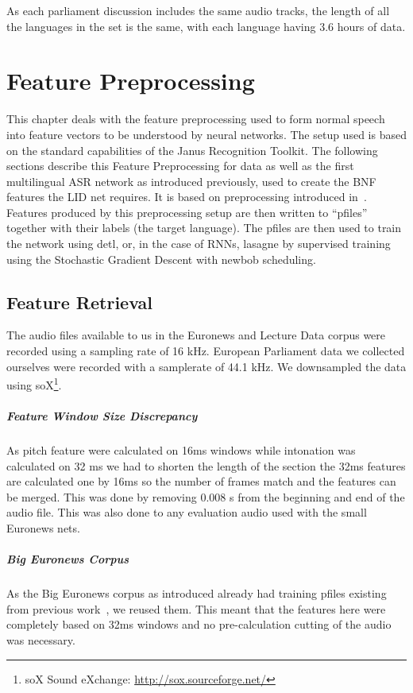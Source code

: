 As each parliament discussion includes the same audio tracks, the length of all the languages in the set is the same, with each language having 3.6 hours of data. 

\chapter{Feature Preprocessing}
\label{ch:FP}

This chapter deals with the feature preprocessing used to form normal speech into feature vectors to be understood by neural networks. The setup used is based on the standard capabilities of the Janus Recognition Toolkit. The following sections describe this Feature Preprocessing for data as well as the first multilingual ASR network as introduced previously, used to create the BNF features the LID net requires.  It is based on preprocessing introduced in~\cite{Mueller2016b}.
Features produced by this preprocessing setup are then written to ``pfiles'' together with their labels (the target language). The pfiles are then used to train the network using detl, or, in the case of RNNs, lasagne by supervised training using the Stochastic Gradient Descent with newbob scheduling.

\section{Feature Retrieval}
\label{sec:FP:FA}
The audio files available to us in the Euronews and Lecture Data corpus were recorded using a sampling rate of 16 kHz. European Parliament data we collected ourselves were recorded with a samplerate of 44.1 kHz. We downsampled the data using soX\footnote{soX Sound eXchange: \url{http://sox.sourceforge.net/}}. 
\paragraph{Feature Window Size Discrepancy} As pitch feature were calculated on 16ms windows while intonation was calculated on 32 ms we had to shorten the length of the section the 32ms features are calculated one by 16ms so the number of frames match and the features can be merged. This was done by removing  0.008 s from the beginning and end of the audio file. This was also done to any evaluation audio used with the small Euronews nets.
\paragraph{Big Euronews Corpus} As the Big Euronews corpus as introduced already had training pfiles existing from previous work~\cite{Mueller2016b}, we reused them. This meant that the features here were completely based on 32ms windows and no pre-calculation cutting of the audio was necessary.

